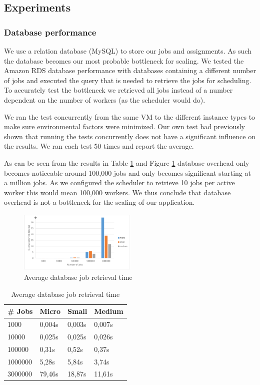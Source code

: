 \documentclass[a4paper]{IEEEtran}
\begin{document}
\subsection{Experiments}

\subsubsection{Database performance}

We use a relation database (MySQL) to store our jobs and assignments. As such the database becomes our most probable bottleneck for scaling. We tested the Amazon RDS database performance with databases containing a different number of jobs and executed the query that is needed to retrieve the jobs for scheduling. To accurately test the bottleneck we retrieved all jobs instead of a number dependent on the number of workers (as the scheduler would do).

We ran the test concurrently from the same VM to the different instance types to make sure environmental factors were minimized. Our own test had previously shown that running the tests concurrently does not have a significant influence on the results. We ran each test 50 times and report the average.

As can be seen from the results in Table \ref{dbperfresults} and Figure \ref{fig_dbperfresults} database overhead only becomes noticeable around 100,000 jobs and only becomes significant starting at a million jobs. As we configured the scheduler to retrieve 10 jobs per active worker this would mean 100,000 workers. We thus conclude that database overhead is not a bottleneck for the scaling of our application.

\begin{figure}
\centering
\includegraphics[width=0.5\textwidth]{"results-database"}
\caption{Average database job retrieval time}
\label{fig_dbperfresults}
\end{figure}

\begin{table}
\caption{Average database job retrieval time}
\label{dbperfresults}
\centering
\begin{tabular}{| l | l | l | l |}
\hline
\# Jobs & Micro & Small & Medium \\ \hline
1000 & 0,004s &	0,003s & 0,007s \\ \hline
10000 & 0,025s & 0,025s & 0,026s \\ \hline
100000 & 0,31s & 0,52s & 0,37s \\ \hline
1000000 & 5,28s & 5,84s & 3,74s \\ \hline
3000000	& 79,46s & 18,87s & 11,61s \\ \hline
\end{tabular}
\end{table}
\end{document}
